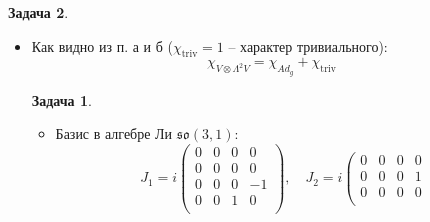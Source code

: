 \documentclass[12pt]{article}
\theoremstyle{definition}
\newtheorem{zad}{Задача}[section]
\begin{document}
\begin{zad}
\begin{itemize}
\begin{equation}
    \begin{array}{cccccccc}
    \cos(2\varphi_1-\varphi_2) & \sin(2\varphi_1-\varphi_2) & 0 & 0 & 0 & 0 & 0 & 0\\
    -\sin(2\varphi_1-\varphi_2) & \cos(2\varphi_1-\varphi_2) & 0 & 0 & 0 & 0 & 0 & 0\\
    0 & 0 & 1 & 0 & 0 & 0 & 0 & 0\\
    0 & 0 & 0 & \cos(\varphi_1+\varphi_2) & \sin(\varphi_1+\varphi_2) & 0 & 0 & 0\\
    0 & 0 & 0 & -\sin(\varphi_1+\varphi_2) & +\cos(\varphi_1+\varphi_2) & 0 & 0 & 0\\
    0 & 0 & 0 & 0 & 0 & \cos(2\varphi_2-\varphi_1) & \sin(2\varphi_2-\varphi_1) & 0\\
    0 & 0 & 0 & 0 & 0 & -\sin(2\varphi_2-\varphi_1) & \cos(2\varphi_2-\varphi_1) & 0\\
    0 & 0 & 0 & 0 & 0 & 0 & 0 & 1\\
    \end{array}
    \right)
    \end{equation}
    Характер присоединённого представления $SU(3)$:
    \begin{equation}
        \boxed{\chi_{Ad_g}=2(1+\cos(2\varphi_1-\varphi_2)+\cos(\varphi_1-2\varphi_2)+\cos(\varphi_1+\varphi_2))}
    \end{equation}
    \item[в)$^*$] Как видно из п. а и б ($\chi_\text{triv}=1$ -- характер тривиального):
    \begin{equation}
        \boxed{\chi_{V\otimes\Lambda^2V}=\chi_{Ad_g}+\chi_\text{triv}}
    \end{equation}
    \begin{zad}
    \begin{itemize}
        \item[а)] Базис в алгебре Ли $\mathfrak{so}(3,1)$:
        \begin{equation*}
            J_1=i\left(
    \begin{array}{cccc}
    0 & 0 & 0 & 0\\
    0 & 0 & 0 & 0\\
    0 & 0 & 0 & -1\\
    0 & 0 & 1 & 0\\
    \end{array}
    \right),\quad J_2=i\left(
    \begin{array}{cccc}
    0 & 0 & 0 & 0\\
    0 & 0 & 0 & 1\\
    0 & 0 & 0 & 0\\

\end{array}
\end{equation*}
\end{itemize}
\end{zad}
\end{itemize}
\end{zad}
\end{document}

